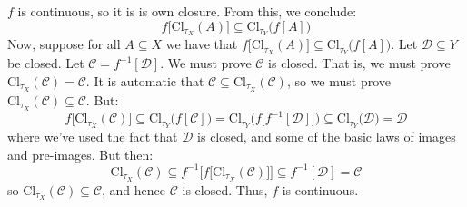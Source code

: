 \documentclass{article}
\theoremstyle{normal}
\begin{document}
    $f$ is continuous, so it is is own closure. From this, we conclude:
    \begin{equation}
        f\big[\textrm{Cl}_{\tau_{X}}(A)\big]
        \subseteq\textrm{Cl}_{\tau_{Y}}\big(f[A]\big)
    \end{equation}
    Now, suppose for all $A\subseteq{X}$ we have that
    $f\big[\textrm{Cl}_{\tau_{X}}(A)\big]\subseteq\textrm{Cl}_{\tau_{Y}}\big(f[A]\big)$.
    Let $\mathcal{D}\subseteq{Y}$ be closed. Let
    $\mathcal{C}=f^{-1}[\mathcal{D}]$. We must prove $\mathcal{C}$ is closed.
    That is, we must prove $\textrm{Cl}_{\tau_{X}}(\mathcal{C})=\mathcal{C}$.
    It is automatic that
    $\mathcal{C}\subseteq\textrm{Cl}_{\tau_{X}}(\mathcal{C})$,
    so we must prove $\textrm{Cl}_{\tau_{X}}(\mathcal{C})\subseteq\mathcal{C}$.
    But:
    \begin{equation}
        f\big[\textrm{Cl}_{\tau_{X}}(\mathcal{C})\big]
        \subseteq\textrm{Cl}_{\tau_{Y}}\big(f[\mathcal{C}]\big)
        =\textrm{Cl}_{\tau_{Y}}\Big(f\big[f^{-1}[\mathcal{D}]\big]\Big)
        \subseteq\textrm{Cl}_{\tau_{Y}}\big(\mathcal{D}\big)
        =\mathcal{D}
    \end{equation}
    where we've used the fact that $\mathcal{D}$ is closed, and some of the
    basic laws of images and pre-images. But then:
    \begin{equation}
        \textrm{Cl}_{\tau_{X}}(\mathcal{C})
        \subseteq{f}^{-1}\Big[
            f\big[
                \textrm{Cl}_{\tau_{X}}(\mathcal{C})
            \big]
        \Big]
        \subseteq{f}^{-1}[\mathcal{D}]
        =\mathcal{C}
    \end{equation}
    so $\textrm{Cl}_{\tau_{X}}(\mathcal{C})\subseteq\mathcal{C}$, and hence
    $\mathcal{C}$ is closed. Thus, $f$ is continuous.
\end{document}
